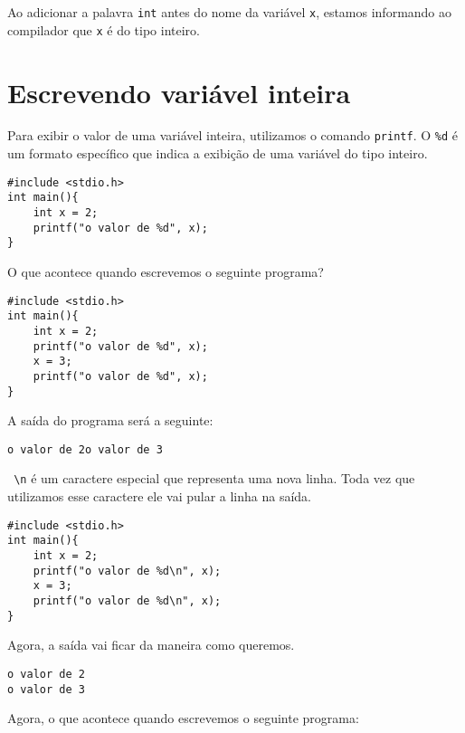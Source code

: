 \documentclass[a4paper,11pt]{article}
\begin{document}
Ao adicionar a palavra \texttt{int} antes do nome da variável \texttt{x}, estamos informando ao compilador que \texttt{x} é do tipo inteiro. 

\section*{Escrevendo variável inteira}

Para exibir o valor de uma variável inteira, utilizamos o comando \texttt{printf}. O \texttt{\%d} é um formato específico que indica a exibição de uma variável do tipo inteiro.

\begin{verbatim}
#include <stdio.h>
int main(){
	int x = 2;
	printf("o valor de %d", x);	 
}
\end{verbatim}

O que acontece quando escrevemos o seguinte programa?

\begin{verbatim}
#include <stdio.h>
int main(){
	int x = 2;
	printf("o valor de %d", x);
	x = 3;
	printf("o valor de %d", x);	 
}
\end{verbatim}

A saída do programa será a seguinte:

\begin{verbatim}
o valor de 2o valor de 3
\end{verbatim}

\texttt{ \textbackslash n}  é um caractere especial que representa uma nova linha. Toda vez que utilizamos esse caractere ele vai pular a linha na saída.

\begin{verbatim}
#include <stdio.h>
int main(){
	int x = 2;
	printf("o valor de %d\n", x);
	x = 3;
	printf("o valor de %d\n", x);	 
}
\end{verbatim}

Agora, a saída vai ficar da maneira como queremos.


\begin{verbatim}
o valor de 2
o valor de 3

\end{verbatim}

Agora, o que acontece quando escrevemos o seguinte programa:
\end{document}

